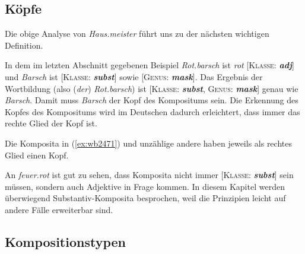 \subsection{Köpfe}

\label{sec:wbkopf}

Die obige Analyse von \textit{Haus.meister} führt uns zu der nächsten wichtigen Definition.


In dem im letzten Abschnitt gegebenen Beispiel \textit{Rot.barsch} ist \textit{rot} [\textsc{Klasse}: \textit{\textbf{adj}}] und \textit{Barsch} ist [\textsc{Klasse}: \textit{\textbf{subst}}] sowie [\textsc{Genus}: \textit{\textbf{mask}}].
Das Ergebnis der Wortbildung (also (\textit{der}) \textit{Rot.barsch}) ist [\textsc{Klasse}: \textit{\textbf{subst}}, \textsc{Genus}: \textit{\textbf{mask}}] genau wie \textit{Barsch}.
Damit muss \textit{Barsch} der Kopf des Kompositums sein.
Die Erkennung des Kopfes des Kompositums wird im Deutschen dadurch erleichtert, dass immer das rechte Glied der Kopf ist.

Die Komposita in (\ref{ex:wb2471}) und unzählige andere haben jeweils als rechtes Glied einen Kopf.

\begin{exe}
  \ex\label{ex:wb2471}
  \begin{xlist}
  \end{xlist}
\end{exe}

An \textit{feuer.rot} ist gut zu sehen, dass Komposita nicht immer [\textsc{Klasse}: \textit{\textbf{subst}}] sein müssen, sondern auch \zB Adjektive in Frage kommen.
In diesem Kapitel werden überwiegend Substantiv-Komposita besprochen, weil die Prinzipien leicht auf andere Fälle erweiterbar sind.

\subsection{Kompositionstypen}

\label{sec:detrekkomp}


